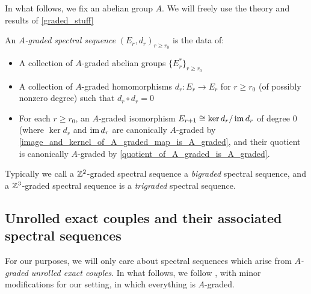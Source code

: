 \documentclass[../main.tex]{subfiles}
\begin{document}
In what follows, we fix an abelian group $A$. We will freely use the theory and results of \autoref{graded_stuff}

\begin{definition}
    An \emph{$A$-graded spectral sequence} $(E_r,d_r)_{r\geq r_0}$ is the data of:\begin{itemize}
        \item A collection of $A$-graded abelian groups $\{E_r^{*}\}_{r\geq r_0}$
        \item A collection of $A$-graded homomorphisms $d_r:E_r\to E_r$ for $r\ge r_0$ (of possibly nonzero degree) such that $d_r\circ d_r=0$ 
        \item For each $r\geq r_0$, an $A$-graded isomorphism $E_{r+1}\cong\ker d_r/\operatorname{im} d_r$ of degree $0$ (where $\ker d_r$ and $\operatorname{im} d_r$ are canonically $A$-graded by \autoref{image_and_kernel_of_A_graded_map_is_A_graded}, and their quotient is canonically $A$-graded by \autoref{quotient_of_A_graded_is_A_graded}.
    \end{itemize}
\end{definition}

Typically we call a $\mathbb{Z}^2$-graded spectral sequence a \emph{bigraded} spectral sequence, and a $\mathbb{Z}^3$-graded spectral sequence is a \emph{trigraded} spectral sequence.


\subsection{Unrolled exact couples and their associated spectral sequences}\label{Unrolled_exact_couples_and_their_associated_SSeqs}

For our purposes, we will only care about spectral sequences which arise from \emph{$A$-graded unrolled exact couples}. In what follows, we follow \cite{Boardman_1999}, with minor modifications for our setting, in which everything is $A$-graded.
\end{document}

